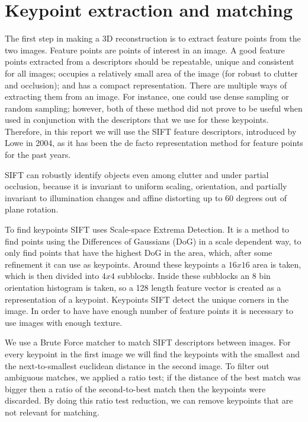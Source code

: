\section{Keypoint extraction and matching}
\label{matching}
The first step in making a 3D reconstruction is to extract feature points from the two images.
Feature points are points of interest in an image.
A good feature points extracted from a descriptors should be repeatable, unique and consistent for all images;
occupies a relatively small area of the image (for robust to clutter and occlusion); and has a compact representation.
There are multiple ways of extracting them from an image.
For instance, one could use dense sampling \cite{DSIFT} or random sampling;
however, both of these method did not prove to be useful when used in conjunction with the descriptors that we use for these keypoints.
Therefore, in this report we will use the SIFT feature descriptors, introduced by Lowe \cite{SIFT} in 2004, as it has been the de facto representation method for feature points for the past years.

SIFT can robustly identify objects even among clutter and under partial occlusion, because it is invariant to uniform scaling, orientation, and partially invariant to illumination changes and affine distorting up to 60 degrees out of plane rotation.

To find keypoints SIFT uses Scale-space Extrema Detection.
It is a method to find points using the Differences of Gaussians (DoG) in a scale dependent way, to only find points that have the highest DoG in the area, which, after some refinement it can use as keypoints.
Around these keypoints a $16x16$ area is taken, which is then divided into $4x4$ subblocks.
Inside these subblocks an 8 bin orientation histogram is taken, so a 128 length feature vector is created as a representation of a keypoint.
Keypoints SIFT detect the unique corners in the image. 
In order to have have enough number of feature points it is necessary to use images with enough texture.

We use a Brute Force matcher to match SIFT descriptors between images. 
For every keypoint in the first image we will find the keypoints with the smallest and the next-to-smallest euclidean distance in the second image. 
To filter out ambiguous matches, we applied a ratio test; if the distance of the best match was bigger then a ratio of the second-to-best match then the keypoints were discarded.
By doing this ratio test reduction, we can remove keypoints that are not relevant for matching.

